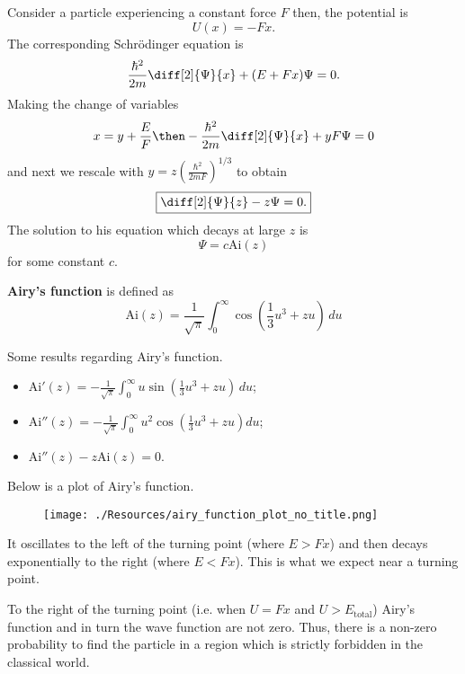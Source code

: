 \documentclass[12pt, a4paper]{article}
\begin{document}
Consider a particle experiencing a constant force \(F\) then, the potential is 
\[U(x) = -Fx.\]
The corresponding Schrödinger equation is 
\[\frac{\hbar^2}{2m}\diff[2]{\Psi}{x} + (E+Fx)\Psi =0.\]
Making the change of variables 
\[x = y + \frac{E}{F} \then -\frac{\hbar^2}{2m} \diff[2]{\Psi}{x} +yF\Psi=0\]
and next we rescale with \(y= z\left( \frac{\hbar^2}{2mF} \right)^{1/3}\) to obtain
\[\fbox{\(\diff[2]{\Psi}{z} -z\Psi=0.\)}\]
The solution to his equation which decays at large \(z\) is 
\[\Psi=c\text{Ai}(z)\]
for some constant \(c\).

\begin{definition}
    \textbf{Airy's function} is defined as 
    \[\text{Ai}(z) = \frac{1}{\sqrt{\pi}} \int_{0}^{\infty} \cos\left( \frac{1}{3}u^3+zu \right) \, du\] 
\end{definition}

\begin{mdprop}
    Some results regarding Airy's function.
    \begin{itemize}
        \item \(\text{Ai}'(z) = -\frac{1}{\sqrt{\pi}} \int_{0}^{\infty} u \sin\left(\frac{1}{3}u^3 + zu\right) \, du\);
        \item \(\text{Ai}''(z) = -\frac{1}{\sqrt{\pi}} \int_{0}^{\infty} u^2 \cos\left(\frac{1}{3}u^3 + zu\right) du\);
        \item \(\text{Ai}''(z) - z\text{Ai}(z) = 0.\)
    \end{itemize}
\end{mdprop}
Below is a plot of Airy's function.

\begin{figure}[H]
     \begin{center}
         \texttt{[image: ./Resources/airy\_function\_plot\_no\_title.png]}
     \end{center}
\end{figure}

\noindent It oscillates to the left of the turning point (where \(E >Fx\)) and then decays exponentially to the right (where \(E<Fx\)). This is what we expect near a turning point.

\begin{mdremark}
    To the right of the turning point (i.e. when \(U =Fx\) and \(U>E_{\text{total}}\)) Airy's function and in turn the wave function are not zero. Thus, there is a non-zero probability to find the particle in a region which is strictly forbidden in the classical world.
\end{mdremark}
\end{document}
